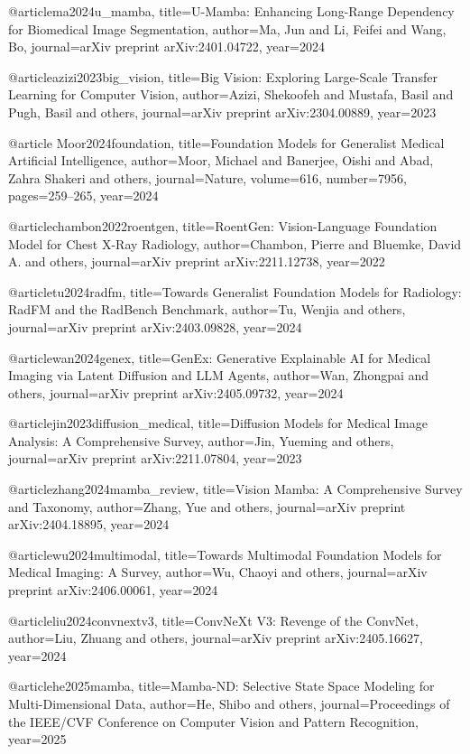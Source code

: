 @article{ma2024u_mamba,
  title={U-Mamba: Enhancing Long-Range Dependency for Biomedical Image Segmentation},
  author={Ma, Jun and Li, Feifei and Wang, Bo},
  journal={arXiv preprint arXiv:2401.04722},
  year={2024}
}

@article{azizi2023big_vision,
  title={Big Vision: Exploring Large-Scale Transfer Learning for Computer Vision},
  author={Azizi, Shekoofeh and Mustafa, Basil and Pugh, Basil and others},
  journal={arXiv preprint arXiv:2304.00889},
  year={2023}
}

@article{ Moor2024foundation,
  title={Foundation Models for Generalist Medical Artificial Intelligence},
  author={Moor, Michael and Banerjee, Oishi and Abad, Zahra Shakeri and others},
  journal={Nature},
  volume={616},
  number={7956},
  pages={259--265},
  year={2024}
}

@article{chambon2022roentgen,
  title={RoentGen: Vision-Language Foundation Model for Chest X-Ray Radiology},
  author={Chambon, Pierre and Bluemke, David A. and others},
  journal={arXiv preprint arXiv:2211.12738},
  year={2022}
}

@article{tu2024radfm,
  title={Towards Generalist Foundation Models for Radiology: RadFM and the RadBench Benchmark},
  author={Tu, Wenjia and others},
  journal={arXiv preprint arXiv:2403.09828},
  year={2024}
}

@article{wan2024genex,
  title={GenEx: Generative Explainable AI for Medical Imaging via Latent Diffusion and LLM Agents},
  author={Wan, Zhongpai and others},
  journal={arXiv preprint arXiv:2405.09732},
  year={2024}
}

@article{jin2023diffusion_medical,
  title={Diffusion Models for Medical Image Analysis: A Comprehensive Survey},
  author={Jin, Yueming and others},
  journal={arXiv preprint arXiv:2211.07804},
  year={2023}
}

@article{zhang2024mamba_review,
  title={Vision Mamba: A Comprehensive Survey and Taxonomy},
  author={Zhang, Yue and others},
  journal={arXiv preprint arXiv:2404.18895},
  year={2024}
}

@article{wu2024multimodal,
  title={Towards Multimodal Foundation Models for Medical Imaging: A Survey},
  author={Wu, Chaoyi and others},
  journal={arXiv preprint arXiv:2406.00061},
  year={2024}
}

@article{liu2024convnextv3,
  title={ConvNeXt V3: Revenge of the ConvNet},
  author={Liu, Zhuang and others},
  journal={arXiv preprint arXiv:2405.16627},
  year={2024}
}

@article{he2025mamba,
  title={Mamba-ND: Selective State Space Modeling for Multi-Dimensional Data},
  author={He, Shibo and others},
  journal={Proceedings of the IEEE/CVF Conference on Computer Vision and Pattern Recognition},
  year={2025}
}

